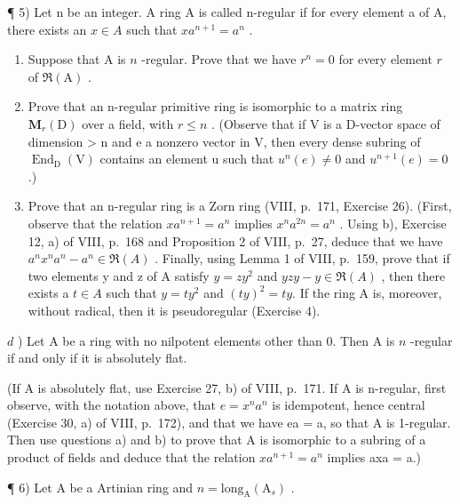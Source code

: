 ¶ 5) Let n be an integer. A ring A is called n-regular if for every element a of A, there exists an \(x \in A\) such that \(xa^{n+1} = a^n\) .

\begin{enumerate}
\def\labelenumi{\alph{enumi})}
\item
  Suppose that \(\mathrm{A}\) is \(n\) -regular. Prove that we have \(r^n = 0\) for every element \(r\) of \(\Re(\mathrm{A})\) .
\item
  Prove that an n-regular primitive ring is isomorphic to a matrix ring \(\mathbf{M}_{r}(\mathrm{D})\) over a field, with \(r \leqslant n\) . (Observe that if V is a D-vector space of dimension \textgreater{} n and e a nonzero vector in V, then every dense subring of \(\operatorname{End}_{\mathrm{D}}(\mathrm{V})\) contains an element u such that \(u^{n}(e) \neq 0\) and \(u^{n+1}(e) = 0\) .)
\item
  Prove that an n-regular ring is a Zorn ring (VIII, p.~171, Exercise 26). (First, observe that the relation \(xa^{n+1}=a^{n}\) implies \(x^{n}a^{2n}=a^{n}\) . Using b), Exercise 12, a) of VIII, p.~168 and Proposition 2 of VIII, p.~27, deduce that we have \(a^{n}x^{n}a^{n}-a^{n}\in\Re(A)\) . Finally, using Lemma 1 of VIII, p.~159, prove that if two elements y and z of A satisfy \(y=zy^{2}\) and \(yzy-y\in\Re(A)\) , then there exists a \(t\in A\) such that \(y=ty^{2}\) and \((ty)^{2}=ty.\) If the ring A is, moreover, without radical, then it is pseudoregular (Exercise 4).
\end{enumerate}

\(d\) ) Let A be a ring with no nilpotent elements other than 0. Then A is \(n\) -regular if and only if it is absolutely flat.

(If A is absolutely flat, use Exercise 27, b) of VIII, p.~171. If A is n-regular, first observe, with the notation above, that \(e = x^{n}a^{n}\) is idempotent, hence central (Exercise 30, a) of VIII, p.~172), and that we have ea = a, so that A is 1-regular. Then use questions a) and b) to prove that A is isomorphic to a subring of a product of fields and deduce that the relation \(xa^{n+1} = a^{n}\) implies axa = a.)

¶ 6) Let A be a Artinian ring and \(n = \text{long}_{\text{A}}(\text{A}_s)\) .

